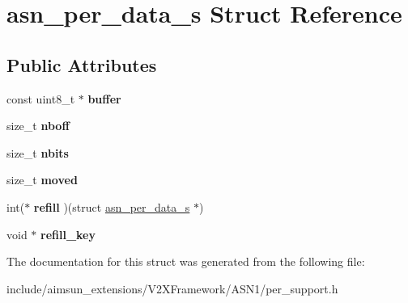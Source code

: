 \hypertarget{structasn__per__data__s}{}\section{asn\+\_\+per\+\_\+data\+\_\+s Struct Reference}
\label{structasn__per__data__s}
\subsection*{Public Attributes}
\begin{DoxyCompactItemize}
\item 
const uint8\+\_\+t $\ast$ {\bfseries buffer}\hypertarget{structasn__per__data__s_a44d99b862f6a541942a64aef1658bbf6}{}\label{structasn__per__data__s_a44d99b862f6a541942a64aef1658bbf6}

\item 
size\+\_\+t {\bfseries nboff}\hypertarget{structasn__per__data__s_a0619c07e943a8b96ae4661f8c5d47582}{}\label{structasn__per__data__s_a0619c07e943a8b96ae4661f8c5d47582}

\item 
size\+\_\+t {\bfseries nbits}\hypertarget{structasn__per__data__s_a11929597749fccb8924b7ae7ecd3935d}{}\label{structasn__per__data__s_a11929597749fccb8924b7ae7ecd3935d}

\item 
size\+\_\+t {\bfseries moved}\hypertarget{structasn__per__data__s_ae457219d0d6f1e0fa24d89af9081ea99}{}\label{structasn__per__data__s_ae457219d0d6f1e0fa24d89af9081ea99}

\item 
int($\ast$ {\bfseries refill} )(struct \hyperlink{structasn__per__data__s}{asn\+\_\+per\+\_\+data\+\_\+s} $\ast$)\hypertarget{structasn__per__data__s_af5327175550501eda70941d045fa3011}{}\label{structasn__per__data__s_af5327175550501eda70941d045fa3011}

\item 
void $\ast$ {\bfseries refill\+\_\+key}\hypertarget{structasn__per__data__s_ab2499e862aa1983fe7df7f65ce088e7e}{}\label{structasn__per__data__s_ab2499e862aa1983fe7df7f65ce088e7e}

\end{DoxyCompactItemize}


The documentation for this struct was generated from the following file\+:\begin{DoxyCompactItemize}
\item 
include/aimsun\+\_\+extensions/\+V2\+X\+Framework/\+A\+S\+N1/per\+\_\+support.\+h\end{DoxyCompactItemize}
